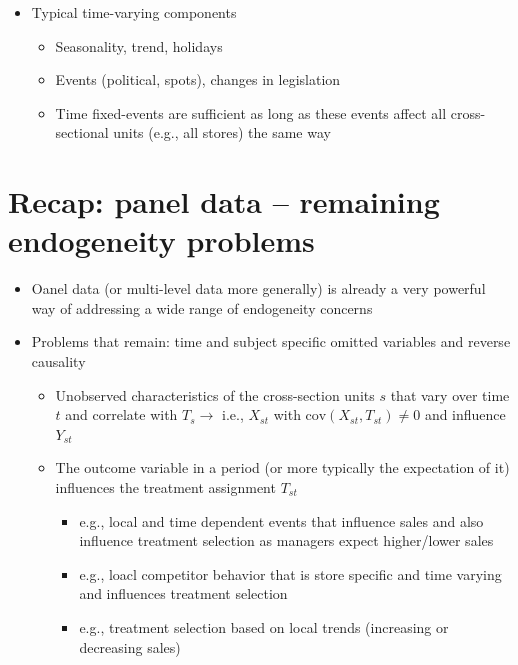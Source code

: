 \documentclass[10pt]{article}
\begin{document}
\begin{itemize}
\begin{itemize}
    \end{itemize}
    \item Typical time-varying components
    \begin{itemize}
        \item Seasonality, trend, holidays 
        \item Events (political, spots), changes in legislation 
        \item Time fixed-events are sufficient as long as these events affect all cross-sectional units (e.g., all stores) the same way 
    \end{itemize}
\end{itemize}
\section{Recap: panel data -- remaining endogeneity problems}
\begin{itemize}
    \item Oanel data (or multi-level data more generally) is already a very powerful way of addressing a wide range of endogeneity concerns 
    \item Problems that remain: time and subject specific omitted variables and reverse causality
    \begin{itemize}
        \item Unobserved characteristics of the cross-section units $s $ that vary over time $ t $ and correlate with $T_s \to $ i.e., $X_{st} $ with $\text{cov}(X_{st}, T_{st}) \neq 0 $ and influence $Y_{st} $
        \item The outcome variable in a period (or more typically the expectation of it) influences the treatment assignment $T_{st} $
        \begin{itemize}
            \item e.g., local and time dependent events that influence sales and also influence treatment selection as managers expect higher/lower sales 
            \item e.g., loacl competitor behavior that is store specific and time varying and influences treatment selection
            \item e.g., treatment selection based on local trends (increasing or decreasing sales)
        \end{itemize}
    \end{itemize}
\end{itemize}
\newpage 
\end{document}
